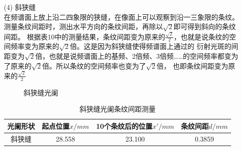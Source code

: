 \documentclass{article}
\begin{document}
\begin{enumerate}
        \item[(4)] 斜狭缝 \\
        在频谱面上放上沿二四象限的狭缝，在像面上可以观察到沿一三象限的条纹。测量条纹间距时，测出水平方向的条纹间距，再除以$\sqrt{2}$即可得到斜向的条纹间距。
        根据表10中的测量结果，条纹间距变为原来的$\frac{\sqrt{2}}{2}$，也就是说条纹的空间频率变为原来的$\sqrt{2}$倍。这是因为斜狭缝使得频谱面上通过的
        衍射光斑的间距变为$\sqrt{2}$倍，也就是说频谱面上的基频、2倍频、3倍频……的空间频率都变为了原来的$\sqrt{2}$倍。所以条纹的空间频率也变为了$\sqrt{2}$倍，
        也即条纹间距变为原来的$\frac{\sqrt{2}}{2}$
        \begin{figure}[h]
            \centering
            \caption{斜狭缝光阑}
        \end{figure}
        \newpage
        \begin{table}[h]
            \centering
            \begin{tabular}{|c|c|c|c|}
                \hline
                光阑形状 & 起点位置$x/mm$ & 10个条纹后的位置$x'/mm$ & 条纹间距$d/mm$ \\
                \hline
                斜狭缝 & 28.558 & 23.100 & 0.3859 \\
                \hline
            \end{tabular}
            \caption{斜狭缝光阑条纹间距测量}
        \end{table}
    \end{enumerate}
\end{document}
